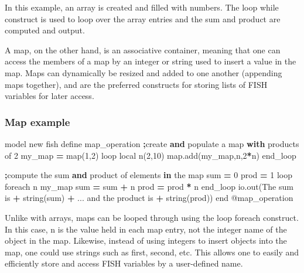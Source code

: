 \documentclass[a4paper, nobind]{templates/ociamthesis}
\newenvironment{Shaded}{\begin{snugshade}}{\end{snugshade}}
\newcommand{\AttributeTok}[1]{\textcolor[rgb]{0.77,0.63,0.00}{#1}}
\newcommand{\BuiltInTok}[1]{#1}
\newcommand{\ControlFlowTok}[1]{\textcolor[rgb]{0.13,0.29,0.53}{\textbf{#1}}}
\newcommand{\DecValTok}[1]{\textcolor[rgb]{0.00,0.00,0.81}{#1}}
\newcommand{\KeywordTok}[1]{\textcolor[rgb]{0.13,0.29,0.53}{\textbf{#1}}}
\newcommand{\NormalTok}[1]{#1}
\newcommand{\OperatorTok}[1]{\textcolor[rgb]{0.81,0.36,0.00}{\textbf{#1}}}
\newcommand{\StringTok}[1]{\textcolor[rgb]{0.31,0.60,0.02}{#1}}
\renewenvironment{Shaded}
{
  \vspace{10pt}%
  \begin{snugshade}%
}{%
  \end{snugshade}%
  \vspace{8pt}%
}
\begin{document}
In this example, an array is created and filled with numbers. The loop
while construct is used to loop over the array entries and the sum and
product are computed and output.

A map, on the other hand, is an associative container, meaning that one
can access the members of a map by an integer or string used to insert a
value in the map. Maps can dynamically be resized and added to one
another (appending maps together), and are the preferred constructs for
storing lists of FISH variables for later access.

\hypertarget{map-example}{%
\subsubsection{Map example}\label{map-example}}

\begin{Shaded}
\begin{Highlighting}[]
\NormalTok{model new}
\NormalTok{fish define map\_operation}
    \OperatorTok{;}\NormalTok{create }\KeywordTok{and}\NormalTok{ populate a }\BuiltInTok{map} \ControlFlowTok{with}\NormalTok{ products of }\DecValTok{2}
\NormalTok{    my\_map }\OperatorTok{=} \BuiltInTok{map}\NormalTok{(}\DecValTok{1}\NormalTok{,}\DecValTok{2}\NormalTok{)}
\NormalTok{    loop local n(}\DecValTok{2}\NormalTok{,}\DecValTok{10}\NormalTok{)}
        \BuiltInTok{map}\NormalTok{.add(my\_map,n,}\DecValTok{2}\OperatorTok{*}\NormalTok{n)}
\NormalTok{    end\_loop}
      
    \OperatorTok{;}\NormalTok{compute the }\BuiltInTok{sum} \KeywordTok{and}\NormalTok{ product of elements }\KeywordTok{in}\NormalTok{ the }\BuiltInTok{map}
    \BuiltInTok{sum} \OperatorTok{=} \DecValTok{0}
\NormalTok{    prod }\OperatorTok{=} \DecValTok{1}
\NormalTok{    loop foreach n my\_map}
        \BuiltInTok{sum} \OperatorTok{=} \BuiltInTok{sum} \OperatorTok{+}\NormalTok{ n}
\NormalTok{        prod }\OperatorTok{=}\NormalTok{ prod }\OperatorTok{*}\NormalTok{ n}
\NormalTok{    end\_loop}
\NormalTok{    io.out(}\StringTok{\textquotesingle{}The sum is \textquotesingle{}} \OperatorTok{+}\NormalTok{ string(}\BuiltInTok{sum}\NormalTok{) }\OperatorTok{+}\NormalTok{ ...}
           \StringTok{\textquotesingle{} and the product is \textquotesingle{}} \OperatorTok{+}\NormalTok{ string(prod))}
\NormalTok{end}
\AttributeTok{@map\_operation}
\end{Highlighting}
\end{Shaded}

Unlike with arrays, maps can be looped through using the loop foreach
construct. In this case, n is the value held in each map entry, not the
integer name of the object in the map. Likewise, instead of using
integers to insert objects into the map, one could use strings such as
first, second, etc. This allows one to easily and efficiently store and
access FISH variables by a user-defined name.
\end{document}
